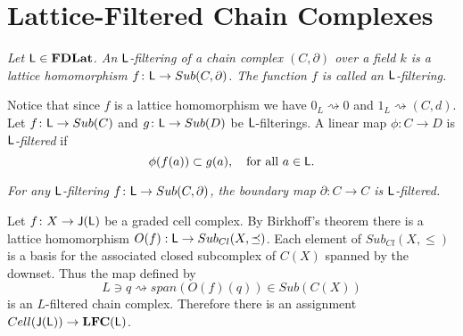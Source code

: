 \section{Lattice-Filtered Chain Complexes}\label{sec:lfc}



\begin{defn}
{\em
Let ${\mathsf L}\in {\bf FDLat}$.
An \emph{${\mathsf L}$-filtering of a chain complex $(C,\partial)$ over a field $k$} is a lattice homomorphism $f\colon {\mathsf L} \to Sub(C,\partial)$.
The function $f$ is called an \emph{${\mathsf L}$-filtering}.
}
\end{defn}


Notice that since $f$ is a lattice homomorphism we have $0_L\rightsquigarrow 0$ and $1_L \rightsquigarrow (C,d)$.  Let $f\colon {\mathsf L} \to Sub(C)$ and $g\colon {\mathsf L} \to Sub(D)$ be ${\mathsf L}$-filterings. 
A linear map $\phi\colon C\to D$ is {\em ${\mathsf L}$-filtered} if
\[
\phi(f(a)) \subset g(a),\quad\text{for all $a\in{\mathsf L}$}.
\]




\begin{ex}
{\em
For any ${\mathsf L}$-filtering $f\colon {\mathsf L} \to Sub(C,\partial)$,
the boundary map $\partial\colon C\to C$ is ${\mathsf L}$-filtered.
}
\end{ex}

\begin{ex}


Let $f\colon X\to {\mathsf J}({\mathsf L})$ be a graded cell complex.  By Birkhoff's theorem there is a lattice homomorphism $O(f):{\mathsf L}\to Sub_{Cl}(X,\preceq)$.  Each element of $Sub_{Cl}(X,\leq)$ is a basis for the associated closed subcomplex of $C(X)$ spanned by the downset.   Thus the map defined by $$L\ni q\rightsquigarrow span(O(f)(q))\in Sub(C(X))$$ is an $L$-filtered chain complex.  Therefore there is an assignment $Cell({\mathsf J}({\mathsf L}))\to {\bf LFC}({\mathsf L})$.


 
\end{ex}








